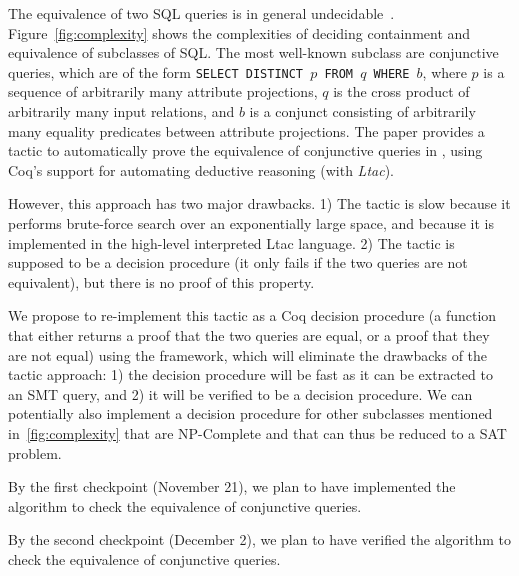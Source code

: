 The equivalence of two SQL queries is in general
undecidable~\cite{sql-hardness-first-order}. Figure~\ref{fig:complexity}
shows the complexities of deciding containment and equivalence of
subclasses of SQL.
%
The most well-known subclass are conjunctive queries, which are of the
form \texttt{SELECT DISTINCT $p$ FROM $q$ WHERE $b$}, where $p$ is a
sequence of arbitrarily many attribute projections, $q$ is the cross
product of arbitrarily many input relations, and $b$ is a conjunct
consisting of arbitrarily many equality predicates between attribute
projections.
%
The \sem paper provides a tactic to automatically prove
the equivalence of conjunctive queries in \sem, using Coq's support
for automating deductive reasoning (with \emph{Ltac}).

However, this approach has two major drawbacks. 
1) The tactic is slow because it performs brute-force search over an exponentially large space, and
   because it is implemented in the high-level interpreted Ltac language.
2) The tactic is supposed to be a decision procedure (it only fails if
   the two queries are not equivalent), but there is no proof of this
   property.

We propose to re-implement this tactic as a Coq decision procedure (a
function that either returns a proof that the two queries are equal,
or a proof that they are not equal) using the \SpaceSearch
framework, which will eliminate the drawbacks of the tactic approach:
1) the decision procedure will be fast as it can be extracted to an SMT query, and
2) it will be verified to be a decision procedure.
%
We can potentially also implement a decision procedure for other
subclasses mentioned in~\ref{fig:complexity} that are NP-Complete and
that can thus be reduced to a SAT problem.

By the first checkpoint (November 21), we plan to have implemented the 
algorithm to check the equivalence of conjunctive queries.

By the second checkpoint (December 2), we plan to have verified the 
algorithm to check the equivalence of conjunctive queries.

